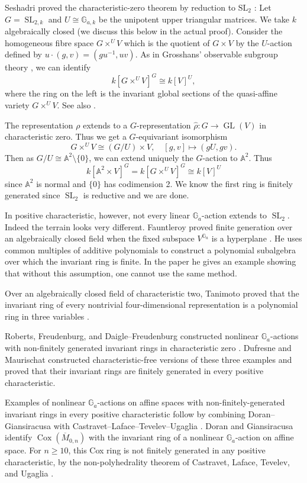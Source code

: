 \documentclass[11pt]{amsart}
\theoremstyle{plain}
\numberwithin{equation}{section}
\DeclareMathOperator{\SL}{SL}
\DeclareMathOperator{\GL}{GL}
\newcommand{\GG}{\mathbb{G}}
\renewcommand{\AA}{\mathbb{A}}
\begin{document}
Seshadri proved the characteristic-zero theorem by reduction to \(\mathrm{SL}_2\) \cite{Seshadri}:
Let \(G = \SL_{2,k}\) and \(U \cong \GG_{a,k}\) be the unipotent upper triangular matrices.
We take \(k\) algebraically closed (we discuss this below in the actual proof).
Consider the homogeneous fibre space \(G \times^{U}V\) which is the quotient of \(G \times V\) by the \(U\)-action defined by \(u \cdot (g,v) = (gu^{-1} , uv)\).
As in Grosshans' observable subgroup theory \cite[Section 9]{Grosshans}, we can identify 
\[k[G\times^{U}V]^{G} \cong k[V]^{U},\]
where the ring on the left is the invariant global sections of the quasi-affine variety \(G \times^U V\).
See also \cite{DoranKirwan}.

The representation \(\rho\) extends to a \(G\)-representation \(\hat{\rho} : G \to \GL(V)\) in characteristic zero.
Thus we get a \(G\)-equivariant isomorphism
\[G \times^{U}V \cong \left(G/U \right)\times V,\quad[g,v]\mapsto (gU,gv).\]
Then as \(G/ U \cong \AA^2\setminus\{0\}\), we can extend uniquely the \(G\)-action to \(\AA^2\).
Thus
\[k[\AA^2 \times V]^{G} = k[G\times^{U}V]^{G} \cong k[V]^{U}\]
since \(\AA^2\) is normal and \(\{0\}\) has codimension 2.
We know the first ring is finitely generated since \(\SL_2\) is reductive and we are done.

In positive characteristic, however, not every linear \(\GG_a\)-action extends to \(\SL_2\).
Indeed the terrain looks very different.
Fauntleroy proved finite generation over an algebraically closed field when the fixed subspace \(V^{\mathbb G_a}\) is a hyperplane \cite{Fauntleroy}.
He uses common multiples of additive polynomials to construct a polynomial subalgebra over which the invariant ring is finite.
In the paper he gives an example showing that without this assumption, one cannot use the same method.

Over an algebraically closed field of characteristic two, Tanimoto proved that the invariant ring of every nontrivial four-dimensional representation is a polynomial ring in three variables \cite{Tanimoto}.

Roberts, Freudenburg, and Daigle–Freudenburg constructed nonlinear \(\mathbb G_a\)-actions with non-finitely generated invariant rings in characteristic zero \cite{Roberts,Freudenburg,DaigleFreudenburg}.
Dufresne and Maurischat \cite{DufresneMaurischat} constructed characteristic-free versions of these three examples and proved that their invariant rings are finitely generated in every positive characteristic.

Examples of nonlinear \(\GG_a\)-actions on affine spaces with non-finitely-generated invariant rings in every positive characteristic follow by combining Doran–Giansiracusa \cite[Corollary 1.3]{DoranGiansiracusa} with Castravet–Laface–Tevelev–Ugaglia  \cite[Theorem 1.2]{CastravetLafaceTevelevUgaglia}.
Doran and Giansiracusa identify \(\operatorname{Cox}(\overline M_{0,n})\) with the invariant ring of a nonlinear \(\mathbb G_a\)-action on affine space.
For \(n\ge 10\), this Cox ring is not finitely generated in any positive characteristic, by the non-polyhedrality theorem of Castravet, Laface, Tevelev, and Ugaglia \cite[Theorem 1.2]{CastravetLafaceTevelevUgaglia}.
\end{document}
